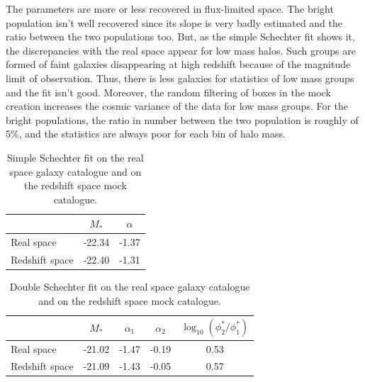 The parameters are more or less recovered in flux-limited space. The bright
population isn't well recovered since its slope is very badly estimated and
the ratio between the two populations too. But, as the simple Schechter fit
shows it, the discrepancies with the real space appear for low mass halos.
Such groups are formed of faint galaxies disappearing at high redshift
because of the magnitude limit of observation. Thus, there is less galaxies
for statistics of low mass groups and the fit isn't good. Moreover, the
random filtering of boxes in the mock creation increases the cosmic variance
of the data for low mass groups. For the bright populations, the ratio
in number between the two  population is roughly of 5\%, and the statistics
are always poor for each bin of halo mass.
%
\begin{table}
    \centering
    \caption{Simple Schechter fit on the real space galaxy catalogue and on
    the redshift space mock catalogue.}
    \begin{tabular}{lcc}
        \toprule
        & $M_*$ & $\alpha$ \\
        \toprule
        Real space & -22.34 & -1.37 \\
        \midrule
        Redshift space & -22.40 & -1.31 \\
        \bottomrule
    \end{tabular}
\end{table}
%
\begin{table}
    \centering
    \caption{Double Schechter fit on the real space galaxy catalogue and on
    the redshift space mock catalogue.}
    \begin{tabular}{lcccc}
        \toprule
        & $M_*$ & $\alpha_1$ & $\alpha_2$ &
        $\log_{10}\left(\phi_2^*/\phi_1^*\right)$ \\
        \toprule
        Real space & -21.02 & -1.47 & -0.19 & 0.53 \\
        \midrule
        Redshift space & -21.09 & -1.43 & -0.05 & 0.57 \\
        \bottomrule
    \end{tabular}
\end{table}

